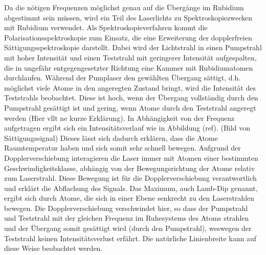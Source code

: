 \documentclass[11pt, a4paper]{article}
\numberwithin{equation}{section}
\newcommand{\korr}[1]{{\color{red}(#1)}}
\begin{document}
Da die nötigen Frequenzen möglichst genau auf die Übergänge im Rubidium abgestimmt sein müssen, wird ein Teil des Laserlichts zu Spektroskopiezwecken mit Rubidium verwendet.
Als Spektroskopieverfahren kommt die Polarisationsspektroskopie zum Einsatz, die eine Erweiterung der dopplerfreien Sättigungsspektroskopie darstellt.
Dabei wird der Lichtstrahl in einen Pumpstrahl mit hoher Intensität und einen Teststrahl mit geringerer Intensität aufgespalten, die in ungefähr entgegengesetzter Richtung eine Kammer mit Rubidiumatomen durchlaufen.
Während der Pumplaser den gewählten Übergang sättigt, d.h. möglichst viele Atome in den angeregten Zustand bringt, wird die Intensität des Teststrahls beobachtet.
Diese ist hoch, wenn der Übergang vollständig durch den Pumpstrahl gesättigt ist und gering, wenn Atome durch den Teststrahl angeregt werden \korr{Hier vllt ne kurze Erklärung}.
In Abhängigkeit von der Frequenz aufgetragen ergibt sich ein Intensitätsverlauf wie in Abbildung \korr{ref}.
\korr{Bild von Sättigungssignal}
Dieses lässt sich dadurch erklären, dass die Atome Raumtemperatur haben und sich somit sehr schnell bewegen.
Aufgrund der Dopplerverschiebung interagieren die Laser immer mit Atomen einer bestimmten Geschwindigkeitsklasse, abhängig von der Bewegungsrichtung der Atome relativ zum Laserstrahl.
Diese Bewegung ist für die Dopplerverschiebung verantwortlich und erklärt die Abflachung des Signals.
Das Maximum, auch Lamb-Dip genannt, ergibt sich durch Atome, die sich in einer Ebene senkrecht zu den Laserstrahlen bewegen.
Die Dopplerverschiebung verschwindet hier, so dass der Pumpstrahl und Teststrahl mit der gleichen Frequenz im Ruhesystems des Atoms strahlen und der Übergang somit gesättigt wird \korr{durch den Pumpstrahl}, weswegen der Teststrahl keinen Intensitätsverlust erfährt.
Die natürliche Linienbreite kann auf diese Weise beobachtet werden.
\end{document}
